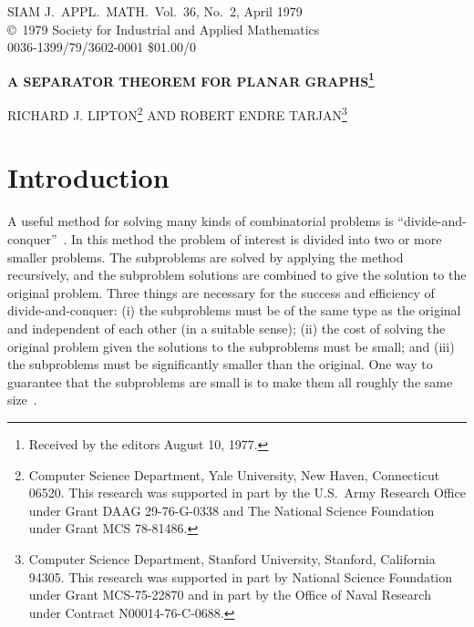 \documentclass[12pt]{article}
\theoremstyle{remark}
\newcommand{\bigO}{\mathcal{O}}
\begin{document}
\begin{center}
  {\small SIAM J.\ APPL.\ MATH.\ Vol.\ 36, No.\ 2, April 1979}\\[2pt]
  {\small \copyright\ 1979 Society for Industrial and Applied Mathematics}\\[2pt]
  {\small 0036-1399/79/3602-0001 \$01.00/0}
  \vspace{1.2em}

  {\Large\bfseries A SEPARATOR THEOREM FOR PLANAR GRAPHS\footnote{Received by
  the editors August 10, 1977.}}

  \vspace{0.8em}
  {\large RICHARD J. LIPTON\footnote{Computer Science Department, Yale
  University, New Haven, Connecticut 06520. This research was supported in part
  by the U.S.\ Army Research Office under Grant DAAG 29-76-G-0338 and The
  National Science Foundation under Grant MCS 78-81486.}\; AND ROBERT ENDRE
  TARJAN\footnote{Computer Science Department, Stanford University, Stanford,
  California 94305. This research was supported in part by National Science
  Foundation under Grant MCS-75-22870 and in part by the Office of Naval
  Research under Contract N00014-76-C-0688.}}
\end{center}

\begin{abstract}
Let $G$ be any $n$-vertex planar graph. We prove that the vertices of $G$ can be
partitioned into three sets $A$, $B$, $C$ such that no edge joins a vertex in $A$
with a vertex in $B$, neither $A$ nor $B$ contains more than $2n/3$ vertices, and
$C$ contains no more than $2\sqrt{2}\sqrt{n}$ vertices. We exhibit an algorithm
which finds such a partition $A$, $B$, $C$ in $\bigO(n)$ time.
\end{abstract}

\section{Introduction}

A useful method for solving many kinds of combinatorial problems is
``divide-and-conquer''~\cite{aho74}. In this method the problem of interest is
divided into two or more smaller problems. The subproblems are solved by applying
the method recursively, and the subproblem solutions are combined to give the
solution to the original problem. Three things are necessary for the success and
efficiency of divide-and-conquer: (i) the subproblems must be of the same type as
the original and independent of each other (in a suitable sense); (ii) the cost of
solving the original problem given the solutions to the subproblems must be small;
and (iii) the subproblems must be significantly smaller than the original. One way to
guarantee that the subproblems are small is to make them all roughly the same
size~\cite{aho74}.
\end{document}
